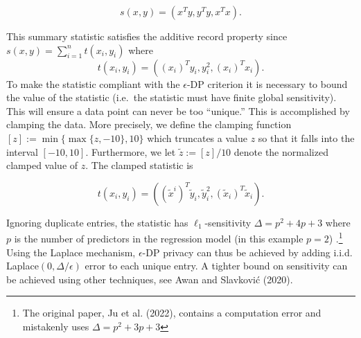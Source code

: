\[
s(x,y) = (x^Ty, y^Ty, x^Tx).
\]

This summary statistic satisfies the additive record property since \(s(x,y) = \sum_{i=1}^{n} t(x_i, y_i)\)
where
\[
t(x_i,y_i) = ((x_{i})^T y_i, y_i^2, (x_{i})^T x_i).
\]
To make the statistic compliant with
the \(\epsilon\)-DP criterion it is
necessary to bound the value of the statistic
(i.e.~the statistic must have finite global sensitivity). This will ensure
a data point can never be too ``unique.'' This is accomplished
by clamping the data. More precisely, we define
the clamping function \([z] := \min\{\max\{z,-10\}, 10\}\) which truncates a value
\(z\) so that it falls into the interval \([-10,10]\). Furthermore, we let \(\tilde{z} := [z]/10\)
denote the normalized clamped value of \(z\). The clamped statistic is

\[
t(x_i,y_i) = ((\tilde{x}^{i})^T \tilde{y}_i, \tilde{y}_i^2, (\tilde{x}_{i})^T \tilde{x}_i).
\]

Ignoring duplicate entries, the statistic has \(\ell_1\)-sensitivity \(\Delta = p^2 + 4p + 3\)
where \(p\) is the number of predictors in the regression model (in this example \(p = 2\))
.\footnote{The original paper, Ju et al. (2022), contains a computation error and mistakenly uses \(\Delta = p^2 + 3p + 3\)}
Using the Laplace mechanism, \(\epsilon\)-DP privacy can thus be achieved by adding i.i.d. Laplace\((0, \Delta/\epsilon)\)
error to each unique entry. A tighter bound on sensitivity can be achieved using
other techniques, see Awan and Slavković (2020).

